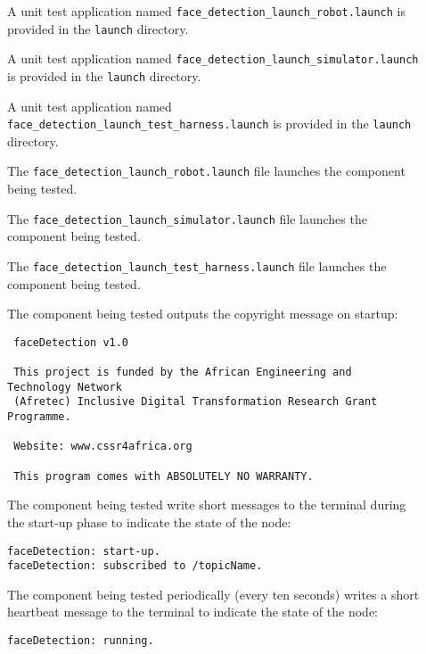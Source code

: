 \documentclass{CSSRforAfrica}
\newcommand{\checkboxChecked}{\fbox{\ding{51}}} %
\newcommand{\checkboxDashed}{\fbox{--}}         %
\begin{document}
\begin{description}

\item[\checkboxDashed] A unit test application named {\small \verb+face_detection_launch_robot.launch+} is provided in the {\small \verb+launch+} directory.

\item[\checkboxDashed] A unit test application named {\small \verb+face_detection_launch_simulator.launch+} is provided in the {\small \verb+launch+} directory.

\item[\checkboxDashed] A unit test application named {\small \verb+face_detection_launch_test_harness.launch+} is provided in the {\small \verb+launch+} directory.

\item[\checkboxDashed] The {\small \verb+face_detection_launch_robot.launch+} file launches the component being tested.

\item[\checkboxDashed] The {\small \verb+face_detection_launch_simulator.launch+} file launches the component being tested.

\item[\checkboxDashed] The {\small \verb+face_detection_launch_test_harness.launch+} file launches the component being tested.

\item[\checkboxChecked] The component being tested outputs the copyright message on startup:
{\small 
\begin{verbatim}
 faceDetection v1.0
 
 This project is funded by the African Engineering and Technology Network 
 (Afretec) Inclusive Digital Transformation Research Grant Programme.
 
 Website: www.cssr4africa.org
 
 This program comes with ABSOLUTELY NO WARRANTY.
\end{verbatim}}

\newpage
\item[\checkboxChecked]  The component being tested write short messages to the terminal during the start-up phase to indicate the state of the node:
{\small 
\begin{verbatim}
faceDetection: start-up.
faceDetection: subscribed to /topicName.
\end{verbatim}}

\item[\checkboxChecked]   The component being tested periodically (every ten seconds) writes a short heartbeat message to the terminal to indicate the state of the node:
{\small 
\begin{verbatim}
faceDetection: running.
\end{verbatim}}


\end{description}
\end{document}
